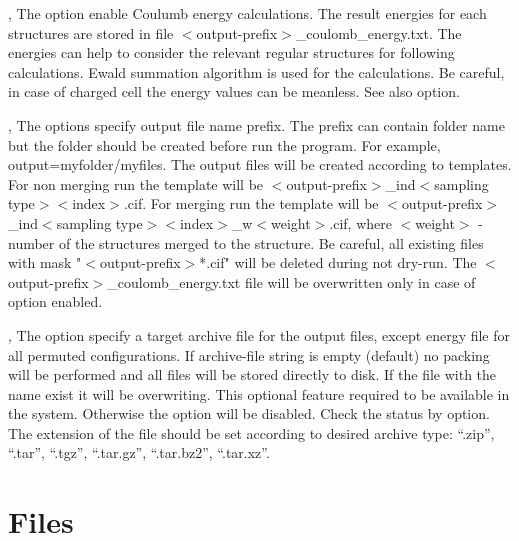 \documentclass[a4paper,english]{article}
\begin{document}
\begin{Description}
\item[\Opt{-q}, \Opt{\Dd coulomb-energy}] 
      The option enable Coulumb energy calculations. The result energies for each structures are stored in file $<$output-prefix$>$\_coulomb\_energy.txt. The energies can help to consider the relevant regular structures for following calculations. Ewald summation algorithm is used for the calculations. Be careful, in case of charged cell the energy values can be meanless. See also  option.
      
\item[\OptArg{-o }{output-prefix}, \OptArg{\Dd output=}{output-prefix}]
      The options specify output file name prefix. The prefix can contain folder name but the folder should be created before run the program. For example, \Dd output=myfolder/myfiles. The output files will be created according to templates. For non merging run the template will be $<$output-prefix$>$\_ind$<$sampling type$><$index$>$.cif. For merging run the template will be $<$output-prefix$>$\_ind$<$sampling type$><$index$>$\_w$<$weight$>$.cif, where $<$weight$>$ - number of the structures merged to the structure. Be careful, all existing files with mask "$<$output-prefix$>$*.cif" will be deleted during not dry-run. The $<$output-prefix$>$\_coulomb\_energy.txt file will be overwritten only in case of  option enabled.
      
\item[\OptArg{-a }{archive-file}, \OptArg{\Dd archive=}{archive-file}]
      The option specify a target archive file for the output files, except energy file for all permuted configurations. If archive-file string is empty (default) no packing will be performed and all files will be stored directly to disk. If the file with the name exist it will be overwriting. This optional feature required   to be available in the system. Otherwise the option will be disabled. Check the status by  option. The extension of the file should be set according to desired archive type: ``.zip'', ``.tar'', ``.tgz'', ``.tar.gz'', ``.tar.bz2'', ``.tar.xz''.

\end{Description}

\section{Files}

\end{document}
